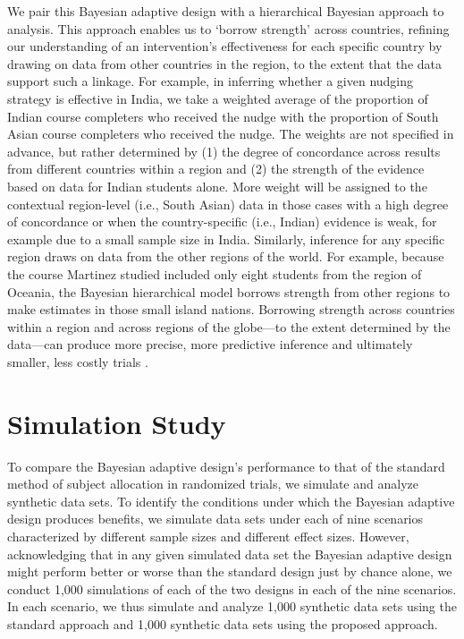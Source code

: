 \documentclass{acm_proc_article-sp}
\begin{document}
We pair this Bayesian adaptive design with a hierarchical Bayesian approach to analysis. This approach enables us to ‘borrow strength' across countries, refining our understanding of an intervention's effectiveness for each specific country by drawing on data from other countries in the region, to the extent that the data support such a linkage. For example, in inferring whether a given nudging strategy is effective in India, we take a weighted average of the proportion of Indian course completers who received the nudge with the proportion of South Asian course completers who received the nudge. The weights are not specified in advance, but rather determined by (1) the degree of concordance across results from different countries within a region and (2) the strength of the evidence based on data for Indian students alone. More weight will be assigned to the contextual region-level (i.e., South Asian) data in those cases with a high degree of concordance or when the country-specific (i.e., Indian) evidence is weak, for example due to a small sample size in India. Similarly, inference for any specific region draws on data from the other regions of the world. For example, because the course Martinez studied included only eight students from the region of Oceania, the Bayesian hierarchical model borrows strength from other regions to make estimates in those small island nations. Borrowing strength across countries within a region and across regions of the globe—to the extent determined by the data—can produce more precise, more predictive inference \cite{gelman2014bayesian} and ultimately smaller, less costly trials \cite{berry2010bayesian}.

\section{Simulation Study}
To compare the Bayesian adaptive design's performance to that of the standard method of subject allocation in randomized trials, we simulate and analyze synthetic data sets. To identify the conditions under which the Bayesian adaptive design produces benefits, we simulate data sets under each of nine scenarios characterized by different sample sizes and different effect sizes. However, acknowledging that in any given simulated data set the Bayesian adaptive design might perform better or worse than the standard design just by chance alone, we conduct 1,000 simulations of each of the two designs in each of the nine scenarios. In each scenario, we thus simulate and analyze 1,000 synthetic data sets using the standard approach and 1,000 synthetic data sets using the proposed approach.
\end{document}
